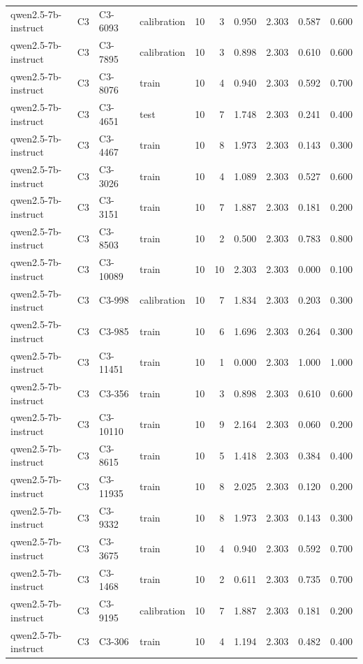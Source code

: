 \begin{table}
\begin{tabular}{llllrrrrrr}
qwen2.5-7b-instruct & C3 & C3-6093 & calibration & 10 & 3 & 0.950 & 2.303 & 0.587 & 0.600 \\
qwen2.5-7b-instruct & C3 & C3-7895 & calibration & 10 & 3 & 0.898 & 2.303 & 0.610 & 0.600 \\
qwen2.5-7b-instruct & C3 & C3-8076 & train & 10 & 4 & 0.940 & 2.303 & 0.592 & 0.700 \\
qwen2.5-7b-instruct & C3 & C3-4651 & test & 10 & 7 & 1.748 & 2.303 & 0.241 & 0.400 \\
qwen2.5-7b-instruct & C3 & C3-4467 & train & 10 & 8 & 1.973 & 2.303 & 0.143 & 0.300 \\
qwen2.5-7b-instruct & C3 & C3-3026 & train & 10 & 4 & 1.089 & 2.303 & 0.527 & 0.600 \\
qwen2.5-7b-instruct & C3 & C3-3151 & train & 10 & 7 & 1.887 & 2.303 & 0.181 & 0.200 \\
qwen2.5-7b-instruct & C3 & C3-8503 & train & 10 & 2 & 0.500 & 2.303 & 0.783 & 0.800 \\
qwen2.5-7b-instruct & C3 & C3-10089 & train & 10 & 10 & 2.303 & 2.303 & 0.000 & 0.100 \\
qwen2.5-7b-instruct & C3 & C3-998 & calibration & 10 & 7 & 1.834 & 2.303 & 0.203 & 0.300 \\
qwen2.5-7b-instruct & C3 & C3-985 & train & 10 & 6 & 1.696 & 2.303 & 0.264 & 0.300 \\
qwen2.5-7b-instruct & C3 & C3-11451 & train & 10 & 1 & 0.000 & 2.303 & 1.000 & 1.000 \\
qwen2.5-7b-instruct & C3 & C3-356 & train & 10 & 3 & 0.898 & 2.303 & 0.610 & 0.600 \\
qwen2.5-7b-instruct & C3 & C3-10110 & train & 10 & 9 & 2.164 & 2.303 & 0.060 & 0.200 \\
qwen2.5-7b-instruct & C3 & C3-8615 & train & 10 & 5 & 1.418 & 2.303 & 0.384 & 0.400 \\
qwen2.5-7b-instruct & C3 & C3-11935 & train & 10 & 8 & 2.025 & 2.303 & 0.120 & 0.200 \\
qwen2.5-7b-instruct & C3 & C3-9332 & train & 10 & 8 & 1.973 & 2.303 & 0.143 & 0.300 \\
qwen2.5-7b-instruct & C3 & C3-3675 & train & 10 & 4 & 0.940 & 2.303 & 0.592 & 0.700 \\
qwen2.5-7b-instruct & C3 & C3-1468 & train & 10 & 2 & 0.611 & 2.303 & 0.735 & 0.700 \\
qwen2.5-7b-instruct & C3 & C3-9195 & calibration & 10 & 7 & 1.887 & 2.303 & 0.181 & 0.200 \\
qwen2.5-7b-instruct & C3 & C3-306 & train & 10 & 4 & 1.194 & 2.303 & 0.482 & 0.400 \\

\end{tabular}
\end{table}

